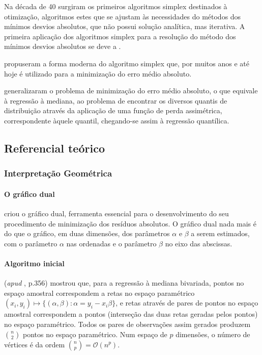 \documentclass[a4paper, 12pt]{article}
\let\oldparagraph\paragraph
\renewcommand{\paragraph}[1]{\oldparagraph{#1}\mbox{}}
\begin{document}
Na década de 40 surgiram os primeiros algoritmos simplex destinados à
otimização, algoritmos estes que se ajustam às necessidades do métodos
dos mínimos desvios absolutos, que não possui solução analítica, mas
iterativa. A primeira aplicação dos algoritmos simplex para a resolução
do método dos mínimos desvios absolutos se deve a \textcite{charnes}
\autocites[ver][281]{tortoise}[4]{conopt}.

\textcite{barrodale} propuseram a forma moderna do algoritmo simplex
que, por muitos anos e até hoje é utilizado para a minimização do erro
médio absoluto.

\textcite{koenker1978} generalizaram o problema de minimização do erro
médio absoluto, o que equivale à regressão à mediana, ao problema de
encontrar os diversos quantis de distribuição através da aplicação de
uma função de perda assimétrica, correspondente àquele quantil,
chegando-se assim à regressão quantílica.

\hypertarget{referencial-teorico}{%
\subsection{Referencial teórico}\label{referencial-teorico}}

\hypertarget{interpretacao-geometrica}{%
\subsubsection{Interpretação
Geométrica}\label{interpretacao-geometrica}}

\hypertarget{o-grafico-dual}{%
\paragraph{O gráfico dual}\label{o-grafico-dual}}

\textcite{edgeworth1888} criou o gráfico dual, ferramenta essencial para
o desenvolvimento do seu procedimento de minimização dos resíduos
absolutos. O gráfico dual nada mais é do que o gráfico, em duas
dimensões, dos parâmetros \(\alpha\) e \(\beta\) a serem estimados, com
o parâmetro \(\alpha\) nas ordenadas e o parâmetro \(\beta\) no eixo das
abscissas.

\hypertarget{algoritmo-inicial}{%
\paragraph{Algoritmo inicial}\label{algoritmo-inicial}}

\textcite{edgeworth1888} (\emph{apud} \textcite{koenker2000}, p.356)
mostrou que, para a regressão à mediana bivariada, pontos no espaço
amostral correspondem a retas no espaço paramétrico
\((x_i, y_i) \mapsto \{(\alpha, \beta): \alpha = y_i - x_i \beta\}\), e
retas através de pares de pontos no espaço amostral correspondem a
pontos (interseção das duas retas geradas pelos pontos) no espaço
paramétrico. Todos os pares de observações assim gerados produzem
\(\binom{n}{2}\) pontos no espaço paramétrico. Num espaço de \(p\)
dimensões, o número de vértices é da ordem
\(\binom{n}{p} = \mathcal{O}(n^p)\).
\end{document}
